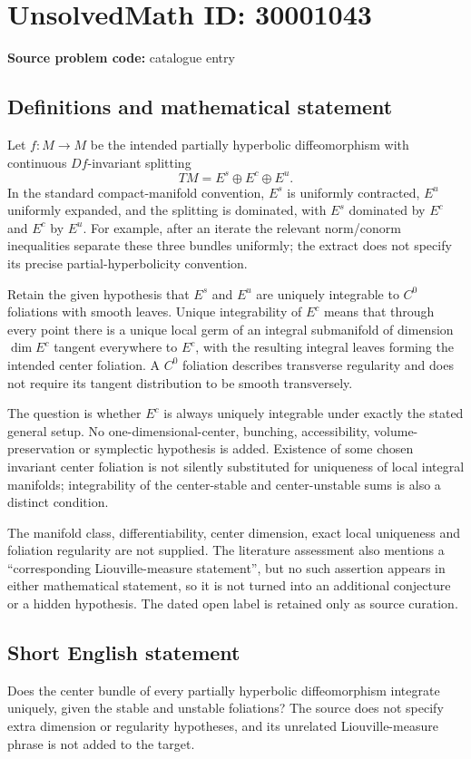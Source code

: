\documentclass[11pt]{article}
\begin{document}
\section*{UnsolvedMath ID: 30001043}
\textbf{Source problem code:} catalogue entry
\subsection{Definitions and mathematical statement}
Let $f:M\to M$ be the intended partially hyperbolic diffeomorphism with continuous $Df$-invariant splitting
\[
TM=E^s\oplus E^c\oplus E^u.
\]
In the standard compact-manifold convention, $E^s$ is uniformly contracted, $E^u$ uniformly expanded, and the splitting is dominated, with $E^s$ dominated by $E^c$ and $E^c$ by $E^u$. For example, after an iterate the relevant norm/conorm inequalities separate these three bundles uniformly; the extract does not specify its precise partial-hyperbolicity convention.

Retain the given hypothesis that $E^s$ and $E^u$ are uniquely integrable to $C^0$ foliations with smooth leaves. Unique integrability of $E^c$ means that through every point there is a unique local germ of an integral submanifold of dimension $\dim E^c$ tangent everywhere to $E^c$, with the resulting integral leaves forming the intended center foliation. A $C^0$ foliation describes transverse regularity and does not require its tangent distribution to be smooth transversely.

The question is whether $E^c$ is always uniquely integrable under exactly the stated general setup. No one-dimensional-center, bunching, accessibility, volume-preservation or symplectic hypothesis is added. Existence of some chosen invariant center foliation is not silently substituted for uniqueness of local integral manifolds; integrability of the center-stable and center-unstable sums is also a distinct condition.

The manifold class, differentiability, center dimension, exact local uniqueness and foliation regularity are not supplied. The literature assessment also mentions a ``corresponding Liouville-measure statement'', but no such assertion appears in either mathematical statement, so it is not turned into an additional conjecture or a hidden hypothesis. The dated open label is retained only as source curation.
\subsection{Short English statement}
Does the center bundle of every partially hyperbolic diffeomorphism integrate uniquely, given the stable and unstable foliations? The source does not specify extra dimension or regularity hypotheses, and its unrelated Liouville-measure phrase is not added to the target.
\end{document}
